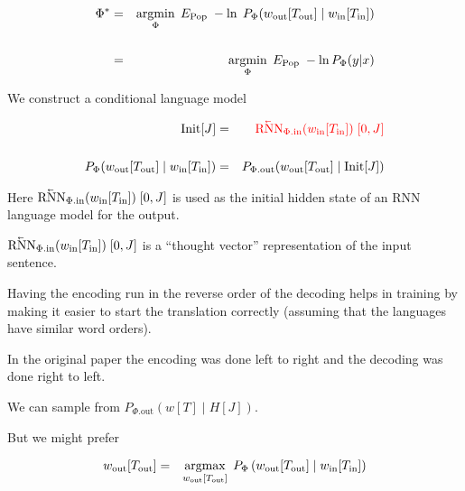 {\vfill
\begin{eqnarray*}
\Phi^*  & = & \operatorname*{argmin}_\Phi\; E_{\mathrm{Pop}} \;-\ln\;P_\Phi(w_{\mathrm{out}}[T_{\mathrm{out}}] \;|\; w_{\mathrm{in}}[T_{\mathrm{in}}]) \\
\\
& = & \operatorname*{argmin}_\Phi \; E_{\mathrm{Pop}} \; -\ln P_\Phi(y|x)
\end{eqnarray*}



\vfill
We construct a conditional language model

\begin{eqnarray*}
\mathrm{Init}[J] & = & {\color{red} \cev{\mathrm{RNN}}_{\Phi.\mathrm{in}}(w_{\mathrm{in}}[T_{\mathrm{in}}])\;[0,J]} \\
\\
P_\Phi(w_{\mathrm{out}}[T_{\mathrm{out}}]\; | \; w_{\mathrm{in}}[T_{\mathrm{in}}]) & = & P_{\Phi.\mathrm{out}}(w_{\mathrm{out}}[T_{\mathrm{out}}] \;|\;\mathrm{Init}[J])
\end{eqnarray*}

\vfill
Here {\color{red} $\cev{\mathrm{RNN}}_{\Phi.\mathrm{in}}(w_{\mathrm{in}}[T_{\mathrm{in}}])\;[0,J]$} is used as the initial hidden state of an RNN language model for the output.

\vfill
{\color{red} $\cev{\mathrm{RNN}}_{\Phi.\mathrm{in}}(w_{\mathrm{in}}[T_{\mathrm{in}}])\;[0,J]$} is a ``thought vector'' representation of the input sentence.


Having the encoding run in the reverse order of the decoding helps in training by making it easier to start the translation correctly
(assuming that the languages have similar word orders).

\vfill
In the original paper the encoding was done left to right and the decoding was done right to left.


We can sample from $P_{\Phi.\mathrm{out}}(w[T]\;|\;H[J])$.

\vfill
But we might prefer

\begin{eqnarray*}
w_{\mathrm{out}}[T_{\mathrm{out}}]
& = & \operatorname*{argmax}_{w_{\mathrm{out}}[T_{\mathrm{out}}]} \;P_\Phi\left(w_{\mathrm{out}}[T_{\mathrm{out}}] \;|\; w_{\mathrm{in}}[T_{\mathrm{in}}] \right)
\end{eqnarray*}

}
